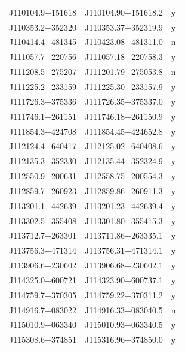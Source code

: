 \begin{table}
\begin{tabular}{ccc}
        J110104.9+151618 & J110104.90+151618.2 & y\\
        J110353.2+352320 & J110353.37+352319.9 & y\\
        J110414.4+481345 & J110423.08+481311.0 & n\\
        J111057.7+220756 & J111057.18+220758.3 & y\\
        J111208.5+275207 & J111201.79+275053.8 & n\\
        J111225.2+233159 & J111225.30+233157.9 & y\\
        J111726.3+375336 & J111726.35+375337.0 & y\\
        J111746.1+261151 & J111746.18+261150.9 & y\\
        J111854.3+424708 & J111854.45+424652.8 & y\\
        J112124.4+640417 & J112125.02+640408.6 & y\\
        J112135.3+352330 & J112135.44+352324.9 & y\\
        J112550.9+200631 & J112558.75+200554.3 & y\\
        J112859.7+260923 & J112859.86+260911.3 & y\\
        J113201.1+442639 & J113201.23+442639.4 & y\\
        J113302.5+355408 & J113301.80+355415.3 & y\\
        J113712.7+263301 & J113711.86+263335.1 & y\\
        J113756.3+471314 & J113756.31+471314.1 & y\\
        J113906.6+230602 & J113906.68+230602.1 & y\\
        J114325.0+600721 & J114323.90+600737.1 & y\\
        J114759.7+370305 & J114759.22+370311.2 & y\\
        J114916.7+083022 & J114916.33+083040.5 & n\\
        J115010.9+063340 & J115010.93+063340.5 & y\\
        J115308.6+374851 & J115316.96+374850.0 & y\\\hline\hline
  \end{tabular}
\end{table}
